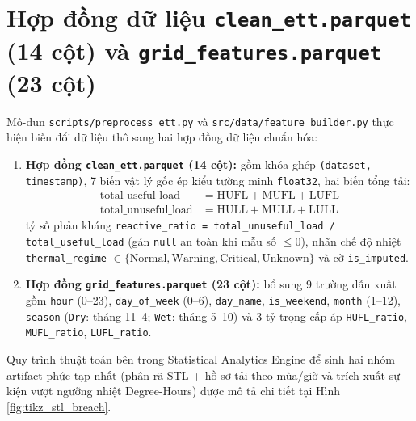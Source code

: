 \documentclass[12pt,a4paper,oneside]{report}
\newcommand{\code}[1]{\texttt{#1}}
\begin{document}
\section{Hợp đồng dữ liệu \code{clean\_ett.parquet} (14 cột) và \code{grid\_features.parquet} (23 cột)}

Mô-đun \code{scripts/preprocess\_ett.py} và \code{src/data/feature\_builder.py} thực hiện biến đổi dữ liệu thô sang hai hợp đồng dữ liệu chuẩn hóa:
\begin{enumerate}
  \item \textbf{Hợp đồng \code{clean\_ett.parquet} (14 cột):} gồm khóa ghép \code{(dataset, timestamp)}, 7 biến vật lý gốc ép kiểu tường minh \code{float32}, hai biến tổng tải:
  \begin{align}
    \text{total\_useful\_load}   &= \text{HUFL} + \text{MUFL} + \text{LUFL} \\
    \text{total\_unuseful\_load} &= \text{HULL} + \text{MULL} + \text{LULL}
  \end{align}
  tỷ số phản kháng \code{reactive\_ratio = total\_unuseful\_load / total\_useful\_load} (gán \code{null} an toàn khi mẫu số $\le 0$), nhãn chế độ nhiệt \code{thermal\_regime} $\in \{\text{Normal}, \text{Warning}, \text{Critical}, \text{Unknown}\}$ và cờ \code{is\_imputed}.
  \item \textbf{Hợp đồng \code{grid\_features.parquet} (23 cột):} bổ sung 9 trường dẫn xuất gồm \code{hour} (0--23), \code{day\_of\_week} (0--6), \code{day\_name}, \code{is\_weekend}, \code{month} (1--12), \code{season} (\code{Dry}: tháng 11--4; \code{Wet}: tháng 5--10) và 3 tỷ trọng cấp áp \code{HUFL\_ratio}, \code{MUFL\_ratio}, \code{LUFL\_ratio}.
\end{enumerate}

Quy trình thuật toán bên trong Statistical Analytics Engine để sinh hai nhóm artifact phức tạp nhất (phân rã STL + hồ sơ tải theo mùa/giờ và trích xuất sự kiện vượt ngưỡng nhiệt Degree-Hours) được mô tả chi tiết tại Hình \ref{fig:tikz_stl_breach}.
\end{document}
